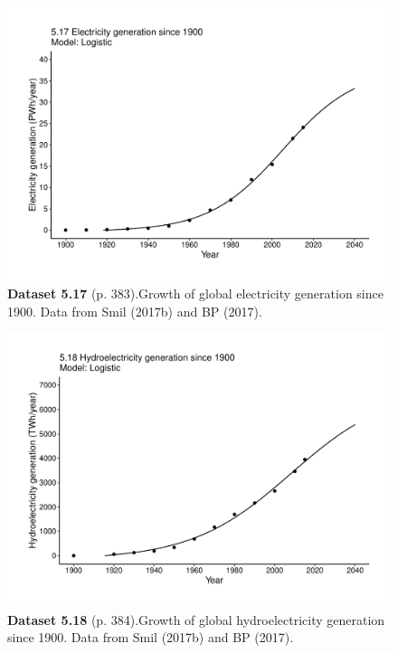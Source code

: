 \documentclass[aps,rmp,preprint,superscriptaddress,10pt,onecolumn]{article}
\begin{document}
\clearpage
\begin{figure}[h]
\includegraphics[width=\textwidth]{output/figs-ggplot/5.17.pdf}
\caption*{\textbf{Dataset 5.17} (p. 383).Growth of global electricity generation since 1900. Data from Smil (2017b) and BP (2017). }
\end{figure}
	
\clearpage
\begin{figure}[h]
\includegraphics[width=\textwidth]{output/figs-ggplot/5.18.pdf}
\caption*{\textbf{Dataset 5.18} (p. 384).Growth of global hydroelectricity generation since 1900. Data from Smil (2017b) and BP (2017).}
\end{figure}
	
\end{document}

